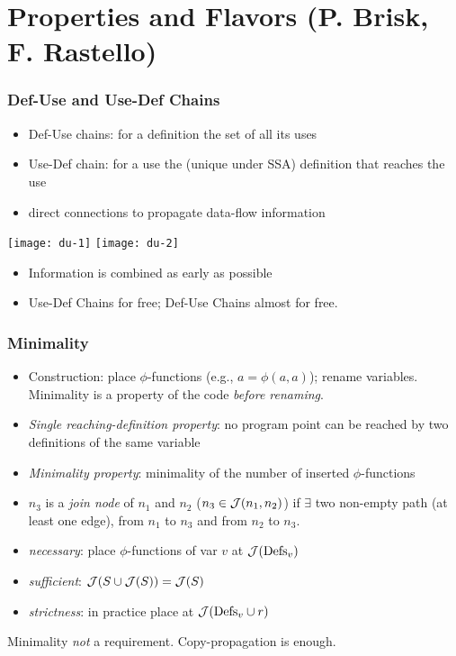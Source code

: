 

\section{Properties and Flavors (P. Brisk, F. Rastello)}
\begin{frame}
\frametitle{Def-Use and Use-Def Chains}
\begin{itemize}
\item Def-Use chains: for a definition the set of all its uses
\item Use-Def chain: for a use the (unique under SSA) definition that reaches the use
\item direct connections to propagate data-flow information
\end{itemize}
\begin{minipage}[t]{0.5\textwidth}
\texttt{[image: du-1]}\hfill
\texttt{[image: du-2]}
\end{minipage}
\begin{minipage}[t]{0.48\textwidth}
\begin{itemize}
\item Information is combined as early as possible
\item Use-Def Chains for free; Def-Use Chains almost for free. 
\end{itemize}
\end{minipage}
\end{frame}

\begin{frame}
\frametitle{Minimality}
\begin{itemize}
\item Construction: place $\phi$-functions (e.g., $a=\phi(a,a)$); rename variables. Minimality is a property of the code \emph{before renaming}.
\item \emph{Single reaching-definition property}: no program point can be reached
by two definitions of the same variable
\item \emph{Minimality property}: minimality of the number of inserted $\phi$-functions
\item $n_3$ is a \emph{join node}  of $n_1$ and $n_2$ ($n_3\in {\cal J}(n_1,n_2)$) if $\exists$ two non-empty path (at least one edge), from $n_1$ to $n_3$ and from $n_2$ to $n_3$. 
\item \emph{necessary}: place $\phi$-functions of var $v$ at ${\cal J}(\textrm{Defs}_v)$
\item \emph{sufficient}: ${\cal J}(S \cup{\cal J}(S))={\cal J}(S)$
\item \emph{strictness}: in practice place at   ${\cal J}(\textrm{Defs}_v\cup r)$ 
\end{itemize}
\begin{minipage}{0.7\textwidth}
\begin{alertblock}{}
Minimality \emph{not} a requirement. Copy-propagation is enough.
\end{alertblock}
\end{minipage}
\end{frame}

